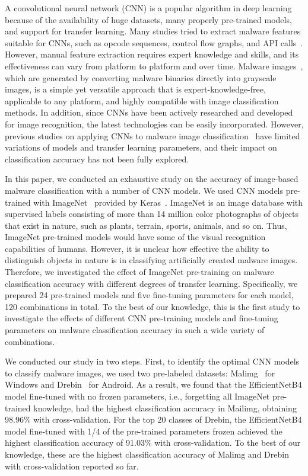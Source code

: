 \documentclass[conference]{IEEEtran}
\begin{document}
A convolutional neural network (CNN) is a popular algorithm in deep learning because of the availability of huge datasets, many properly pre-trained models, and support for transfer learning.
Many studies tried to extract malware features suitable for CNNs, such as opcode sequences, control flow graphs, and API calls~\cite{10.1145/3417978}.
However, manual feature extraction requires expert knowledge and skills, and its effectiveness can vary from platform to platform and over time.
Malware images~\cite{10.1145/2016904.2016908}, which are generated by converting malware binaries directly into grayscale images, is a simple yet versatile approach that is expert-knowledge-free, applicable to any platform, and highly compatible with image classification methods.
In addition, since CNNs have been actively researched and developed for image recognition, the latest technologies can be easily incorporated.
However, previous studies on applying CNNs to malware image classification~\cite{8330042,8260773,10.1145/3320326.3320333,8328749,8763852,10.1145/3194452.3194459,forse18,forse19,VASAN2020107138} have limited variations of models and transfer learning parameters, and their impact on classification accuracy has not been fully explored.

In this paper, we conducted an exhaustive study on the accuracy of image-based malware classification with a number of CNN models.
We used CNN models pre-trained with ImageNet~\cite{5206848} provided by Keras~\cite{Keras}. 
ImageNet is an image database with supervised labels consisting of more than 14 million color photographs of objects that exist in nature, such as plants, terrain, sports, animals, and so on.
Thus, ImageNet pre-trained models would have some of the visual recognition capabilities of humans.
However, it is unclear how effective the ability to distinguish objects in nature is in classifying artificially created malware images.
Therefore, we investigated the effect of ImageNet pre-training on malware classification accuracy with different degrees of transfer learning.
Specifically, we prepared 24 pre-trained models and five fine-tuning parameters for each model, 120 combinations in total.
To the best of our knowledge, this is the first study to investigate the effects of different CNN pre-training models and fine-tuning parameters on malware classification accuracy in such a wide variety of combinations.

We conducted our study in two steps.
First, to identify the optimal CNN models to classify malware images, we used two pre-labeled datasets: Malimg~\cite{Malimg} for Windows and Drebin~\cite{Drebin} for Android.
As a result, we found that the EfficientNetB4 model fine-tuned with no frozen parameters, i.e., forgetting all ImageNet pre-trained knowledge, had the highest classification accuracy in Mailimg, obtaining 98.96\% with cross-validation. 
For the top 20 classes of Drebin, the EfficientNetB4 model fine-tuned with 1/4 of the pre-trained parameters frozen achieved the highest classification accuracy of 91.03\% with cross-validation.
To the best of our knowledge, these are the highest classification accuracy of Malimg and Drebin with cross-validation reported so far.
\end{document}
